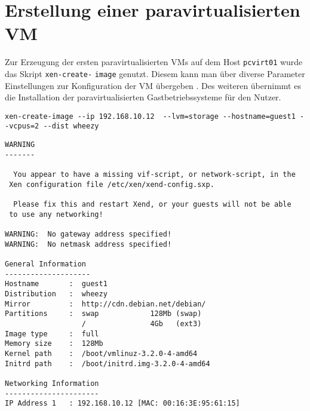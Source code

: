 \section{Erstellung einer paravirtualisierten VM}
Zur Erzeugung der ersten paravirtualisierten VMs auf dem Host \verb#pcvirt01# wurde das Skript \verb#xen-create-# \verb#image# genutzt. Diesem kann man über diverse Parameter Einstellungen zur Konfiguration der VM übergeben \cite{man_xencreateimage}. Des weiteren übernimmt es die Installation der paravirtualisierten Gastbetriebssysteme für den Nutzer.
\begin{verbatim}
xen-create-image --ip 192.168.10.12  --lvm=storage --hostname=guest1 --vcpus=2 --dist wheezy
\end{verbatim}
\setupVerbatimOut
\begin{verbatim}                                                  
WARNING                                           
-------                                           
                                                  
  You appear to have a missing vif-script, or network-script, in the
 Xen configuration file /etc/xen/xend-config.sxp. 
                                                  
  Please fix this and restart Xend, or your guests will not be able
 to use any networking!                           
                                                  
WARNING:  No gateway address specified!           
WARNING:  No netmask address specified!           
                                                  
General Information                               
--------------------                              
Hostname       :  guest1                          
Distribution   :  wheezy                          
Mirror         :  http://cdn.debian.net/debian/   
Partitions     :  swap            128Mb (swap)    
                  /               4Gb   (ext3)    
Image type     :  full                            
Memory size    :  128Mb                           
Kernel path    :  /boot/vmlinuz-3.2.0-4-amd64     
Initrd path    :  /boot/initrd.img-3.2.0-4-amd64  
                                                  
Networking Information                            
----------------------                            
IP Address 1   : 192.168.10.12 [MAC: 00:16:3E:95:61:15]
                                                  

\end{verbatim}
